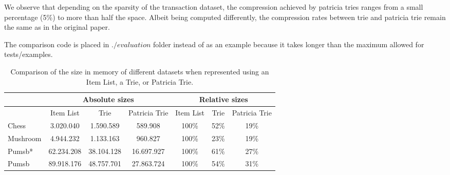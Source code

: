 \documentclass[a4paper,10pt,table,xcdraw]{article}
\begin{document}
We observe that depending on the sparsity of the transaction dataset, the compression achieved by patricia tries ranges from a small percentage (5\%) to more than half the space. Albeit being computed differently, the compression rates between trie and patricia trie remain the same as in the original paper.

The comparison code is placed in $./evaluation$ folder instead of as an example because it takes longer than the maximum allowed for tests/examples. 

\begin{table}[h]
\centering
\caption{Comparison of the size in memory of different datasets when represented using an Item List, a Trie, or Patricia Trie.}
\label{fig:comparison}
\begin{tabular}{lllllll}
\cline{2-7}
\multicolumn{1}{l|}{} & \multicolumn{3}{c|}{\cellcolor[HTML]{EFEFEF}Absolute sizes} & \multicolumn{3}{c|}{\cellcolor[HTML]{EFEFEF}Relative sizes} \\ \hline
\rowcolor[HTML]{DAE8FC} 
\multicolumn{1}{|l|}{\cellcolor[HTML]{EFEFEF}Dataset \textbackslash Structure} & \multicolumn{1}{c|}{\cellcolor[HTML]{DAE8FC}Item List} & \multicolumn{1}{c|}{\cellcolor[HTML]{DAE8FC}Trie} & \multicolumn{1}{c|}{\cellcolor[HTML]{DAE8FC}Patricia Trie} & \multicolumn{1}{c|}{\cellcolor[HTML]{DAE8FC}Item List} & \multicolumn{1}{c|}{\cellcolor[HTML]{DAE8FC}Trie} & \multicolumn{1}{c|}{\cellcolor[HTML]{DAE8FC}Patricia Trie} \\ \hline
\multicolumn{1}{|l|}{\cellcolor[HTML]{DAE8FC}Chess} & \multicolumn{1}{c|}{3.020.040} & \multicolumn{1}{c|}{1.590.589} & \multicolumn{1}{c|}{589.908} & \multicolumn{1}{c|}{100\%} & \multicolumn{1}{c|}{52\%} & \multicolumn{1}{c|}{19\%} \\ \hline
\multicolumn{1}{|l|}{\cellcolor[HTML]{DAE8FC}Mushroom} & \multicolumn{1}{c|}{4.944.232} & \multicolumn{1}{c|}{1.133.163} & \multicolumn{1}{c|}{960.827} & \multicolumn{1}{c|}{100\%} & \multicolumn{1}{c|}{23\%} & \multicolumn{1}{c|}{19\%} \\ \hline
\multicolumn{1}{|l|}{\cellcolor[HTML]{DAE8FC}Pumsb*} & \multicolumn{1}{c|}{62.234.208} & \multicolumn{1}{c|}{38.104.128} & \multicolumn{1}{c|}{16.697.927} & \multicolumn{1}{c|}{100\%} & \multicolumn{1}{c|}{61\%} & \multicolumn{1}{c|}{27\%} \\ \hline
\multicolumn{1}{|l|}{\cellcolor[HTML]{DAE8FC}Pumsb} & \multicolumn{1}{c|}{89.918.176} & \multicolumn{1}{c|}{48.757.701} & \multicolumn{1}{c|}{27.863.724} & \multicolumn{1}{c|}{100\%} & \multicolumn{1}{c|}{54\%} & \multicolumn{1}{c|}{31\%} \\ \hline

\end{tabular}
\end{table}
\end{document}
